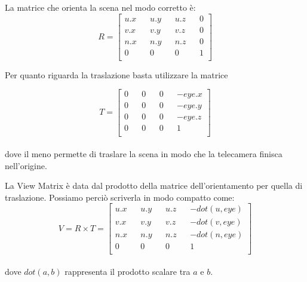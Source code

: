 La matrice che orienta la scena nel modo corretto è:
$$R=
\begin{bmatrix}
u.x && u.y && u.z && 0\\
v.x && v.y && v.z && 0\\
n.x && n.y && n.z && 0\\
0 && 0 && 0 && 1\\
\end{bmatrix}
$$

Per quanto riguarda la traslazione basta utilizzare la matrice

$$T=
\begin{bmatrix}
0 && 0 && 0 && -eye.x\\
0 && 0 && 0 && -eye.y\\
0 && 0 && 0 && -eye.z\\
0 && 0 && 0 && 1\\
\end{bmatrix}
$$\\
dove il meno permette di traslare la scena in modo che la telecamera finisca nell'origine.

La View Matrix è data dal prodotto della matrice dell'orientamento per quella di traslazione.
Possiamo perciò scriverla in modo compatto come:
$$V = R \times T =
\begin{bmatrix}
u.x && u.y && u.z && -dot( u, eye )\\
v.x && v.y && v.z && -dot( v, eye )\\
n.x && n.y && n.z && -dot( n, eye )\\
0 && 0 && 0 && 1\\
\end{bmatrix}
$$\\
dove $dot(a,b)$ rappresenta il prodotto scalare tra $a$ e $b$.


